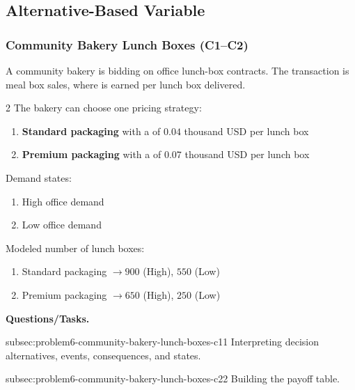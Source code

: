 \subsection{Alternative-Based Variable}
	\label{sec:alternative-based-variable-payoff-profit-per-item-times-number-of-items}


	\subsubsection{Community Bakery Lunch Boxes (C1--C2)}
	\label{sec:problem6-community-bakery-lunch-boxes-c1-c2}
	A community bakery is bidding on office lunch-box contracts. The transaction is meal box sales, where  is earned per lunch box delivered.

	\begin{multicols}{2}
		The bakery can choose one pricing strategy:
		\begin{enumerate}[label=\arabic*.]
			\item \textbf{Standard packaging} with a  of $0.04$ thousand USD per lunch box
			\item \textbf{Premium packaging} with a  of $0.07$ thousand USD per lunch box
		\end{enumerate}

		Demand states:
		\begin{enumerate}[label=\arabic*.]
			\item High office demand
			\item Low office demand
		\end{enumerate}

			\columnbreak

		Modeled number of lunch boxes:
		\begin{enumerate}[label=\arabic*.]
			\item Standard packaging $\to 900$ (High), $550$ (Low)
			\item Premium packaging $\to 650$ (High), $250$ (Low)
		\end{enumerate}
	\end{multicols}

	\textbf{Questions/Tasks.}
	\begin{enumerate}
		\CriterionTask
		{subsec:problem6-community-bakery-lunch-boxes-c1}{1}
		{Interpreting decision alternatives, events, consequences, and states.}

		\CriterionTask
		{subsec:problem6-community-bakery-lunch-boxes-c2}{2}
		{Building the payoff table.}
	\end{enumerate}

